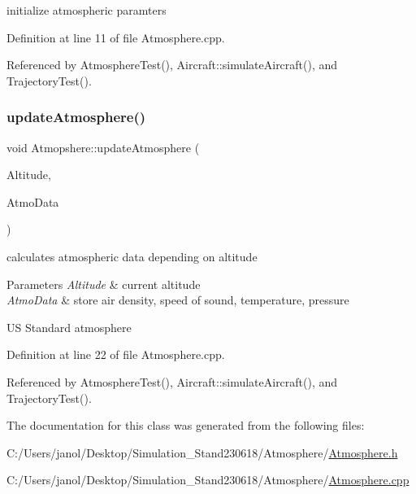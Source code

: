 initialize atmospheric paramters 



Definition at line 11 of file Atmosphere.\+cpp.



Referenced by Atmosphere\+Test(), Aircraft\+::simulate\+Aircraft(), and Trajectory\+Test().

\mbox{\label{class_atmopshere_a2bd97471d32725d6196ee6816ea36c99}} 
\subsubsection{\texorpdfstring{update\+Atmosphere()}{updateAtmosphere()}}
{\footnotesize\ttfamily void Atmopshere\+::update\+Atmosphere (\begin{DoxyParamCaption}\item[{\hyperlink{group___tools_ga3f1431cb9f76da10f59246d1d743dc2c}{Float64} \&}]{Altitude,  }\item[{Atmosphere\+Struct \&}]{Atmo\+Data }\end{DoxyParamCaption})}



calculates atmospheric data depending on altitude 


\begin{DoxyParams}{Parameters}
{\em Altitude} & current altitude \\
\hline
{\em Atmo\+Data} & store air density, speed of sound, temperature, pressure \\
\hline
\end{DoxyParams}
US Standard atmosphere 

Definition at line 22 of file Atmosphere.\+cpp.



Referenced by Atmosphere\+Test(), Aircraft\+::simulate\+Aircraft(), and Trajectory\+Test().



The documentation for this class was generated from the following files\+:\begin{DoxyCompactItemize}
\item 
C\+:/\+Users/janol/\+Desktop/\+Simulation\+\_\+\+Stand230618/\+Atmosphere/\hyperlink{_atmosphere_8h}{Atmosphere.\+h}\item 
C\+:/\+Users/janol/\+Desktop/\+Simulation\+\_\+\+Stand230618/\+Atmosphere/\hyperlink{_atmosphere_8cpp}{Atmosphere.\+cpp}\end{DoxyCompactItemize}
